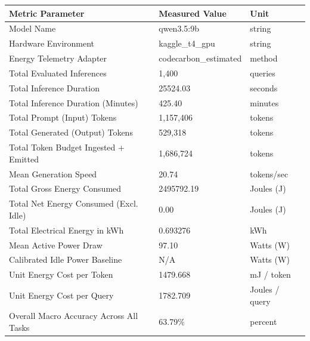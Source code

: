 \begin{tabular}{lll}
\toprule
Metric Parameter & Measured Value & Unit \\
\midrule
Model Name & qwen3.5:9b & string \\
Hardware Environment & kaggle\_t4\_gpu & string \\
Energy Telemetry Adapter & codecarbon\_estimated & method \\
Total Evaluated Inferences & 1,400 & queries \\
Total Inference Duration & 25524.03 & seconds \\
Total Inference Duration (Minutes) & 425.40 & minutes \\
Total Prompt (Input) Tokens & 1,157,406 & tokens \\
Total Generated (Output) Tokens & 529,318 & tokens \\
Total Token Budget Ingested + Emitted & 1,686,724 & tokens \\
Mean Generation Speed & 20.74 & tokens/sec \\
Total Gross Energy Consumed & 2495792.19 & Joules (J) \\
Total Net Energy Consumed (Excl. Idle) & 0.00 & Joules (J) \\
Total Electrical Energy in kWh & 0.693276 & kWh \\
Mean Active Power Draw & 97.10 & Watts (W) \\
Calibrated Idle Power Baseline & N/A & Watts (W) \\
Unit Energy Cost per Token & 1479.668 & mJ / token \\
Unit Energy Cost per Query & 1782.709 & Joules / query \\
Overall Macro Accuracy Across All Tasks & 63.79\% & percent \\
\bottomrule
\end{tabular}

